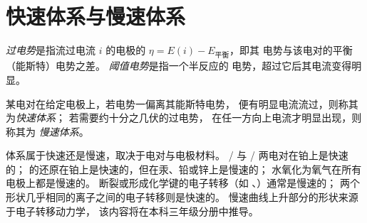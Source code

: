 \section{快速体系与慢速体系}

\begin{definition}[过电势]\label{def:b2:current-potential-curves:overpotential}
\emph{过电势}是指流过电流
$i$ 的电极的 $\eta = E(i) - E_{\text{平衡}}$，即其
电势与该电对的平衡（能斯特）电势之差。
\emph{阈值电势}是指一个半反应的
电势，超过它后其电流变得明显。
\end{definition}

\begin{definition}[快速体系与慢速体系]\label{def:b2:current-potential-curves:fast-slow}
某电对在给定电极上，若电势一偏离其能斯特电势，
便有明显电流流过，则称其为\emph{快速体系}；
若需要约十分之几伏的过电势，
在任一方向上电流才明显出现，则称其为
\emph{慢速体系}。
\end{definition}

体系属于快速还是慢速，取决于电对与电极材料。
/ 与 / 两电对在铂上是快速的；
 的还原在铂上是快速的，但在汞、铅或锌上是慢速的；
水氧化为氧气在所有电极上都是慢速的。
断裂或形成化学键的电子转移（如 、）通常是慢速的；
两个形状几乎相同的离子之间的电子转移则是快速的。
慢速曲线上升部分的形状来源于电子转移动力学，
该内容将在本科三年级分册中推导。

